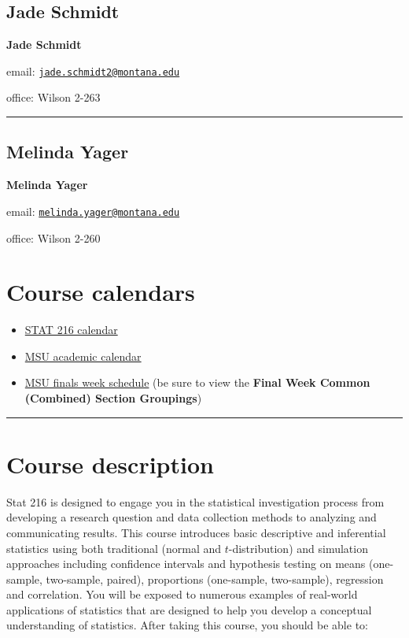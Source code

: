 \documentclass[
]{article}
\providecommand{\tightlist}{%
  \setlength{\itemsep}{0pt}\setlength{\parskip}{0pt}}
\begin{document}
\subsection{Jade Schmidt}\label{jade-schmidt}

\textbf{Jade Schmidt}

email:
\href{mailto:jade.schmidt2@montana.edu}{\nolinkurl{jade.schmidt2@montana.edu}}

office: Wilson 2-263

\begin{center}\rule{0.5\linewidth}{0.5pt}\end{center}

\subsection{Melinda Yager}\label{melinda-yager}

\textbf{Melinda Yager}

email:
\href{mailto:melinda.yager@montana.edu}{\nolinkurl{melinda.yager@montana.edu}}

office: Wilson 2-260

\section{Course calendars}\label{course-calendars}

\begin{itemize}
\tightlist
\item
  \href{calendars/F26-Stat216_Calendar.pdf}{STAT 216 calendar}
\item
  \href{http://catalog.montana.edu/academiccalendar/}{MSU academic
  calendar}
\item
  \href{https://www.montana.edu/registrar/Schedules.html}{MSU finals
  week schedule} (be sure to view the \textbf{Final Week Common
  (Combined) Section Groupings})
\end{itemize}

\begin{center}\rule{0.5\linewidth}{0.5pt}\end{center}

\section{Course description}\label{course-description}

Stat 216 is designed to engage you in the statistical investigation
process from developing a research question and data collection methods
to analyzing and communicating results. This course introduces basic
descriptive and inferential statistics using both traditional (normal
and \(t\)-distribution) and simulation approaches including confidence
intervals and hypothesis testing on means (one-sample, two-sample,
paired), proportions (one-sample, two-sample), regression and
correlation. You will be exposed to numerous examples of real-world
applications of statistics that are designed to help you develop a
conceptual understanding of statistics. After taking this course, you
should be able to:
\end{document}
